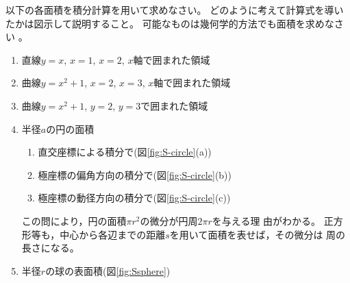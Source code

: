 \documentclass[twocolumn,11pt]{jarticle}
\begin{document}
\exercise
以下の各面積を積分計算を用いて求めなさい。
どのように考えて計算式を導いたかは図示して説明すること。
可能なものは幾何学的方法でも面積を求めなさい
。
\begin{enumerate}
\item\label{item:S:y=x} 直線$y=x$, $x=1$, $x=2$, $x$軸で囲まれた領域
\item\label{item:S:y=x^2+1} 曲線$y=x^2+1$, $x=2$, $x=3$, $x$軸で囲まれた領域
\item\label{item:S:y=(x^2+1)dy} 曲線$y=x^2+1$, $y=2$, $y=3$で囲まれた領域
\item\label{item:S:circle} 半径$a$の円の面積
  \begin{enumerate}
  \item 直交座標による積分で(図\ref{fig:S-circle}(a))
  \item 極座標の偏角方向の積分で(図\ref{fig:S-circle}(b))
  \item 極座標の動径方向の積分で(図\ref{fig:S-circle}(c))
  \end{enumerate}
\comment この問により，円の面積$\pi r^2$の微分が円周$2\pi r$を与える理
由がわかる。
正方形等も，中心から各辺までの距離$s$を用いて面積を表せば，その微分は
周の長さになる。
\item\label{item:S:sphere} 半径$r$の球の表面積(図\ref{fig:Ssphere})
\end{enumerate}
\end{document}
